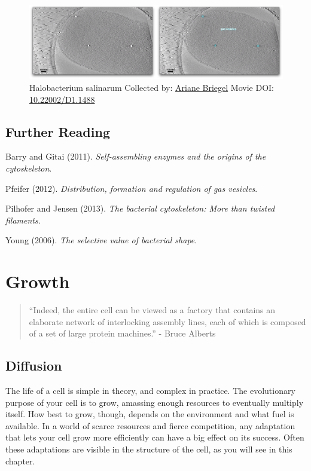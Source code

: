 \documentclass[]{tufte-book}
\begin{document}
\begin{figure}
\includegraphics{movie_stills/3_7a} \caption[Halobacterium salinarum Collected by:
\protect\hyperlink{ariane_briegel}{Ariane Briegel} Movie DOI:
\href{https://doi.org/10.22002/D1.1488}{10.22002/D1.1488}]{Halobacterium salinarum Collected by:
\protect\hyperlink{ariane_briegel}{Ariane Briegel} Movie DOI:
\href{https://doi.org/10.22002/D1.1488}{10.22002/D1.1488}}\label{fig:3-7a}
\end{figure}

\section{Further Reading}\label{further-reading-2}

Barry and Gitai (2011). \emph{Self-assembling enzymes and the origins of
the cytoskeleton}.\citep{barry2011}

Pfeifer (2012). \emph{Distribution, formation and regulation of gas
vesicles}.\citep{pfeifer2012}

Pilhofer and Jensen (2013). \emph{The bacterial cytoskeleton: More than
twisted filaments}.\citep{pilhofer2013}

Young (2006). \emph{The selective value of bacterial
shape}.\citep{young2006}

\chapter{Growth}\label{growth}

\begin{quote}
``Indeed, the entire cell can be viewed as a factory that contains an
elaborate network of interlocking assembly lines, each of which is
composed of a set of large protein machines.'' - Bruce Alberts
\citep{alberts1998}
\end{quote}

\section{Diffusion}\label{diffusion}

The life of a cell is simple in theory, and complex in practice. The
evolutionary purpose of your cell is to grow, amassing enough resources
to eventually multiply itself. How best to grow, though, depends on the
environment and what fuel is available. In a world of scarce resources
and fierce competition, any adaptation that lets your cell grow more
efficiently can have a big effect on its success. Often these
adaptations are visible in the structure of the cell, as you will see in
this chapter.
\end{document}

